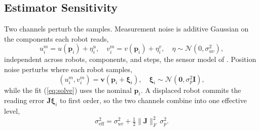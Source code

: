 %

\subsection{Estimator Sensitivity}
\label{sec:sensitivity}

Two channels perturb the samples. Measurement noise is additive
Gaussian on the components each robot reads,
\begin{equation}
    u_i^m = u(\mathbf{p}_i) + \eta_i^u, \quad
    v_i^m = v(\mathbf{p}_i) + \eta_i^v,
    \quad \eta \sim \mathcal{N}(0, \sigma_{uv}^2),
    \label{eq:meas_noise}
\end{equation}
independent across robots, components, and steps, the sensor model of
\cite{9}. Position noise perturbs where each robot
samples,
\begin{equation}
    (u_i^m, v_i^m) = \mathbf{v}(\mathbf{p}_i + \boldsymbol{\xi}_i), \quad
    \boldsymbol{\xi}_i \sim \mathcal{N}(\mathbf{0}, \sigma_p^2 \mathbf{I}),
    \label{eq:pos_noise}
\end{equation}
while the fit (\ref{eq:solve}) uses the nominal $\mathbf{p}_i$. A
displaced robot commits the reading error
$\mathbf{J}\boldsymbol{\xi}_i$ to first order, so the two channels
combine into one effective level,
\begin{equation}
    \sigma_{\mathrm{eff}}^2 = \sigma_{uv}^2
        + \tfrac{1}{2}\lVert\mathbf{J}\rVert_F^2\,\sigma_p^2 .
    \label{eq:sigma_eff}
\end{equation}

